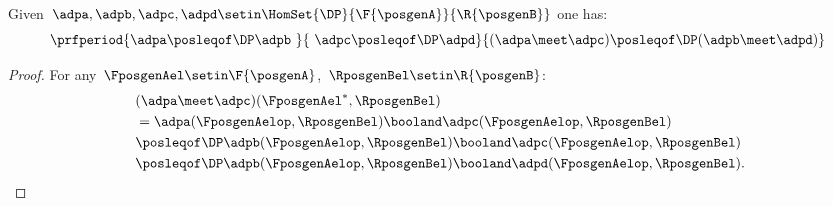 \begin{lemma}
    \label{lem:intersection_mon}
    Given~$\adpa,\adpb,\adpc,\adpd \setin \HomSet{\DP}{\F{\posgenA}}{\R{\posgenB}}$ one has:
    \begin{equation}
        \prfperiod{\adpa\posleqof\DP \adpb\ }{\ \adpc\posleqof\DP \adpd}{(\adpa\meet \adpc)\posleqof\DP (\adpb\meet \adpd)}
    \end{equation}
\end{lemma}
\begin{proof}
    For any~$\FposgenAel\setin \F{\posgenA}$,~$\RposgenBel\setin \R{\posgenB}$:
    \begin{equation}
        \begin{aligned}
            ~ & (\adpa \meet \adpc)(\FposgenAel^*,\RposgenBel) \\
              & =\adpa(\FposgenAelop,\RposgenBel)\booland \adpc(\FposgenAelop,\RposgenBel) \\
              & \posleqof\DP \adpb(\FposgenAelop,\RposgenBel)\booland \adpc(\FposgenAelop,\RposgenBel) \\
              & \posleqof\DP \adpb(\FposgenAelop,\RposgenBel)\booland \adpd(\FposgenAelop,\RposgenBel).
        \end{aligned}
    \end{equation}
\end{proof}
